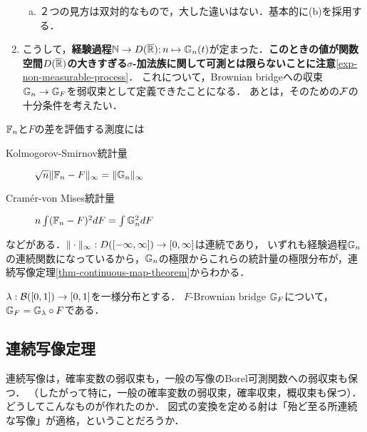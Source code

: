 \documentclass[uplatex,dvipdfmx]{jsreport}
\begin{document}
\begin{example}
\begin{enumerate}
\begin{enumerate}[(a)]
            \item ２つの見方は双対的なもので，大した違いはない．基本的に(b)を採用する．
        \end{enumerate}
        \item 
        こうして，\textbf{経験過程}$\mathbb{N}\to D(\overline{\mathbb{R}});n\mapsto\mathbb{G}_n(t)$が定まった．\textbf{このときの値が関数空間$D(\overline{\mathbb{R}})$の大きすぎる$\sigma$-加法族に関して可測とは限らないことに注意}\ref{exp-non-measurable-process}．
        これについて，Brownian bridgeへの収束$\mathbb{G}_n\to\mathbb{G}_F$を弱収束として定義できたことになる．
        あとは，そのための$\mathcal{F}$の十分条件を考えたい．
    \end{enumerate}
\end{example}

\begin{example}[適合度検定における応用]\label{exp-Kolmogorov-Smirnov-Cramér-von-Mises}
    $\mathbb{F}_n$と$F$の差を評価する測度には
    \begin{description}
        \item[Kolmogorov-Smirnov統計量] $\sqrt{n}\|\mathbb{F}_n-F\|_\infty=\|\mathbb{G}_n\|_\infty$
        \item[Cramér-von Mises統計量] $n\int(\mathbb{F}_n-F)^2dF=\int\mathbb{G}_n^2dF$
    \end{description}
    などがある．$\|\cdot\|_\infty:D([-\infty,\infty])\to[0,\infty]$は連続であり，
    いずれも経験過程$\mathbb{G}_n$の連続関数になっているから，$\mathbb{G}_n$の極限からこれらの統計量の極限分布が，連続写像定理\ref{thm-continuous-map-theorem}からわかる．
\end{example}

\begin{proposition}
    $\lambda:\mathcal{B}([0,1])\to[0,1]$を一様分布とする．
    $F$-Brownian bridge $\mathbb{G}_F$について，$\mathbb{G}_F=\mathbb{G}_\lambda\circ F$である．
\end{proposition}

\subsection{連続写像定理}

\begin{tcolorbox}[colframe=ForestGreen, colback=ForestGreen!10!white,breakable,colbacktitle=ForestGreen!40!white,coltitle=black,fonttitle=\bfseries\sffamily,
title=]
    連続写像は，確率変数の弱収束も，一般の写像のBorel可測関数への弱収束も保つ．
    （したがって特に，一般の確率変数の弱収束，確率収束，概収束も保つ）．
    どうしてこんなものが作れたのか．
    図式の変換を定める射は「殆ど至る所連続な写像」が適格，ということだろうか．
\end{tcolorbox}
\end{document}
